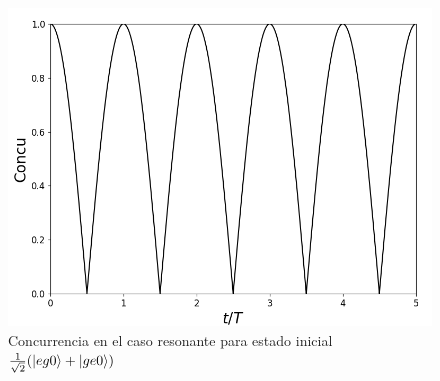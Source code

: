 \begin{figure}[h]
    \begin{minipage}[c]{0.67\textwidth}
        \includegraphics[width=\textwidth]{figuras/ch4/d eg0+ concu d=0.png}
    \end{minipage}\hfill
    \begin{minipage}[c]{0.3\textwidth}
\caption{Concurrencia en el caso resonante para estado inicial $\frac{1}{\sqrt{2}}(\ket{eg0}+\ket{ge0})$} 
    \label{fig4:concu eg0 sim}
  \end{minipage}
\end{figure}

